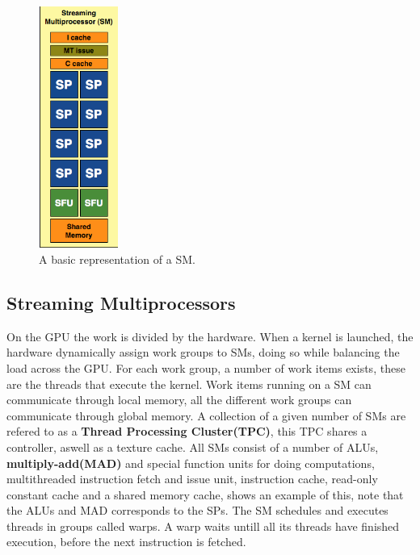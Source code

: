 \begin{figure}
  \vspace{-50pt}
  \begin{center}
    \includegraphics[width=0.23\textwidth]{figures/SM.png}
  \end{center}
  \caption{A basic representation of a SM.}\label{image:SM} 
  \vspace{-35pt}
\end{figure}
\subsection{Streaming Multiprocessors}
On the GPU the work is divided by the hardware.
When a kernel is launched, the hardware dynamically assign work groups to SMs, doing so while balancing the load across the GPU.
For each work group, a number of work items exists, these are the threads that execute the kernel.
Work items running on a SM can communicate through local memory, all the different work groups can communicate through global memory. %
A collection of a given number of SMs are refered to as a \textbf{Thread Processing Cluster(TPC)}, this TPC shares a controller, aswell as a texture cache.
All SMs consist of a number of ALUs, \textbf{multiply-add(MAD)} and special function units for doing computations, multithreaded instruction fetch and issue unit, instruction cache, read-only constant cache and a shared memory cache,  shows an example of this, note that the ALUs and MAD corresponds to the SPs.
The SM schedules and executes threads in groups called warps.
A warp waits untill all its threads have finished execution, before the next instruction is fetched. 

